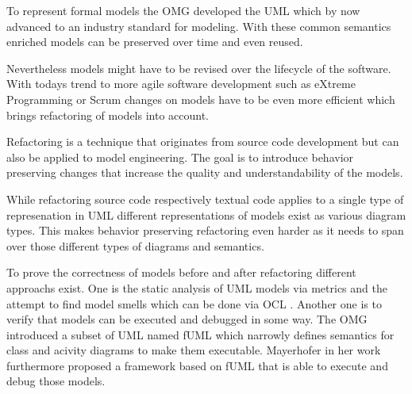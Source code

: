 \documentclass{llncs}
\begin{document}

To represent formal models the OMG developed the UML \cite{man:UML} which by now advanced to an industry standard for modeling. With
these common semantics enriched models can be preserved over time and even reused.


Nevertheless models might have to be revised over the lifecycle of the software. With todays trend to more agile software 
development such as eXtreme Programming \cite{DBLP:journals/computer/Beck99} or Scrum \cite{DBLP:journals/software/RisingJ00} 
changes on models have to be even more efficient which brings refactoring of models into account.


Refactoring is a technique that originates from source code development but can also be applied to model engineering.
The goal is to introduce behavior preserving changes \cite{mast:REFOOF} that increase the quality and understandability
of the models.


While refactoring source code respectively textual code applies to a single type of represenation in UML different
representations of models exist as various diagram types. This makes behavior preserving refactoring even harder as it
needs to span over those different types of diagrams and semantics.


To prove the correctness of models before and after refactoring different approachs exist. One is the static analysis of
UML models via metrics and the attempt to find model smells \cite{DBLP:conf/models/ArendtTW13} which can be done via
OCL \cite{man:OCL}. Another one is to verify that models can be executed and debugged in some way. The OMG introduced a subset 
of UML named fUML \cite{man:FUML} which narrowly defines semantics for class and acivity diagrams to make them executable. 
Mayerhofer \cite{DBLP:conf/icse/Mayerhofer12} in her work furthermore proposed a framework based on fUML that is able to execute
and debug those models.
\end{document}
